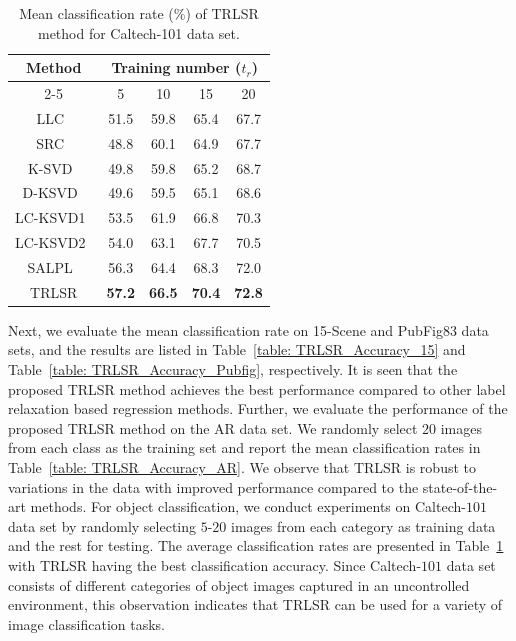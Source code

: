 \begin{table}
\small
\caption{Mean classification rate ($\%$) of TRLSR method for Caltech-101 data set.}
\label{table: TRLSR_Accuracy_Caltech}
\centering
\begin{tabular}{|c|c|c|c|c|}
\hline
\multirow{2}{*}{Method} & \multicolumn{4}{c|}{Training number ($t_r$)}\\ 
\cline{2-5}
& 5 & 10 & 15 & 20\\
\hline 
LLC~\cite{LLC} & 51.5 & 59.8 & 65.4 & 67.7\\ \hline
SRC~\cite{SRC} & 48.8 & 60.1 & 64.9 & 67.7\\ \hline
K-SVD~\cite{KSVD} & 49.8 & 59.8 & 65.2 & 68.7\\ \hline 
D-KSVD~\cite{DKSVD} & 49.6 & 59.5 & 65.1 & 68.6\\ \hline 
LC-KSVD1~\cite{LCKSVD} & 53.5 & 61.9 & 66.8 & 70.3\\ \hline 
LC-KSVD2~\cite{LCKSVD} & 54.0 & 63.1 & 67.7 & 70.5\\ \hline 
SALPL~\cite{SALPL} & 56.3 & 64.4 & 68.3 & 72.0\\ \hline 
TRLSR & \textbf{57.2} & \textbf{66.5} & \textbf{70.4} & \textbf{72.8}\\ 
\hline
\end{tabular}
\end{table}
Next, we evaluate the mean classification rate on 15-Scene and PubFig83 data sets, and the results are listed in Table~\ref{table: TRLSR_Accuracy_15} and Table~\ref{table: TRLSR_Accuracy_Pubfig}, respectively. It is seen that the proposed TRLSR method achieves the best performance compared to other label relaxation based regression methods. Further, we evaluate the performance of the proposed TRLSR method on the AR data set. We randomly select $20$ images from each class as the training set and report the mean classification rates in Table~\ref{table: TRLSR_Accuracy_AR}. We observe that TRLSR is robust to variations in the data with improved performance compared to the state-of-the-art methods. For object classification, we conduct experiments on Caltech-$101$ data set by randomly selecting $5$-$20$ images from each category as training data and the rest for testing. The average classification rates are presented in Table~\ref{table: TRLSR_Accuracy_Caltech} with TRLSR having the best classification accuracy. Since Caltech-$101$ data set consists of different categories of object images captured in an uncontrolled environment, this observation indicates that TRLSR can be used for a variety of image classification tasks.


